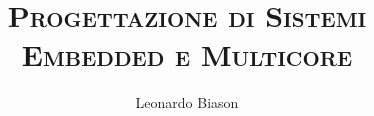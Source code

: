 \documentclass[]{../../../NoTeX/notex}
\title{\textsc{Progettazione di Sistemi Embedded e Multicore}}
\author{Leonardo Biason}
\begin{document}
\maketitle


\pagebreak


\end{document}
